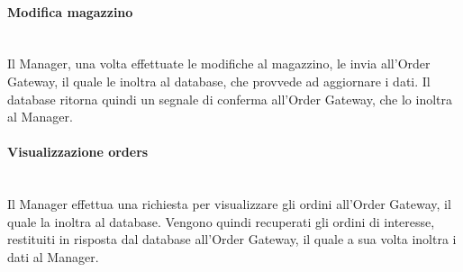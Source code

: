 \paragraph{Modifica magazzino}\mbox{}\\
Il Manager, una volta effettuate le modifiche al magazzino, le invia all’Order Gateway, il quale le inoltra al database, che provvede ad aggiornare i dati. Il database ritorna quindi un segnale di conferma all’Order Gateway, che lo inoltra al Manager.

\paragraph{Visualizzazione orders}\mbox{}\\
Il Manager effettua una richiesta per visualizzare gli ordini all’Order Gateway, il quale la inoltra al database. Vengono quindi recuperati gli ordini di interesse, restituiti in risposta dal database all’Order Gateway, il quale a sua volta inoltra i dati al Manager.

